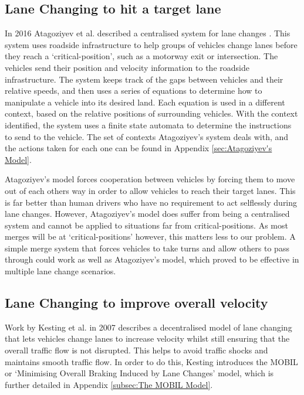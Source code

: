 \subsection{Lane Changing to hit a target lane}
\label{subsec:Lane Changing to hit a target lane}
In 2016 Atagoziyev et al. described a centralised system for lane changes \citep{Atagoziyev2016}. This system uses roadside infrastructure to help groups of vehicles change lanes before they reach a `critical-position', such as a motorway exit or intersection. The vehicles send their position and velocity information to the roadside infrastructure. The system keeps track of the gaps between vehicles and their relative speeds, and then uses a series of equations to determine how to manipulate a vehicle into its desired land. Each equation is used in a different context, based on the relative positions of surrounding vehicles. With the context identified, the system uses a finite state automata to determine the instructions to send to the vehicle. The set of contexts Atagoziyev's system deals with, and the actions taken for each one can be found in Appendix \ref{sec:Atagoziyev's Model}.

Atagoziyev's model forces cooperation between vehicles by forcing them to move out of each others way in order to allow vehicles to reach their target lanes. This is far better than human drivers who have no requirement to act selflessly during lane changes. However, Atagoziyev's model does suffer from being a centralised system and cannot be applied to situations far from critical-positions. As most merges will be at `critical-positions' however, this matters less to our problem. A simple merge system that forces vehicles to take turns and allow others to pass through could work as well as Atagoziyev's model, which proved to be effective in multiple lane change scenarios.

\subsection{Lane Changing to improve overall velocity}
\label{subsec:Lane Changing to improve overall velocity}
Work by Kesting et al. in 2007 \citep{Kesting2007} describes a decentralised model of lane changing that lets vehicles change lanes to increase velocity whilst still ensuring that the overall traffic flow is not disrupted. This helps to avoid traffic shocks and maintains smooth traffic flow. In order to do this, Kesting introduces the MOBIL or `Minimising Overall Braking Induced by Lane Changes' model, which is further detailed in Appendix \ref{subsec:The MOBIL Model}. 

